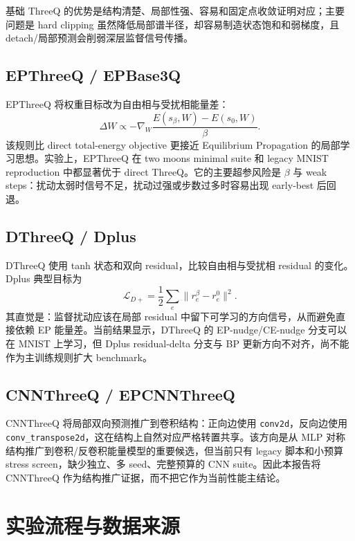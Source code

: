\documentclass[UTF8,zihao=-4]{ctexart}
\begin{document}
        基础 ThreeQ 的优势是结构清楚、局部性强、容易和固定点收敛证明对应；主要问题是 hard clipping 虽然降低局部谱半径，却容易制造状态饱和和弱梯度，且 detach/局部预测会削弱深层监督信号传播。

        \subsection{EPThreeQ / EPBase3Q}

        EPThreeQ 将权重目标改为自由相与受扰相能量差：
        \begin{equation}
        \Delta W \propto -\nabla_W\frac{E(s_\beta,W)-E(s_0,W)}{\beta}.
        \end{equation}
        该规则比 direct total-energy objective 更接近 Equilibrium Propagation 的局部学习思想。实验上，EPThreeQ 在 two moons minimal suite 和 legacy MNIST reproduction 中都显著优于 direct ThreeQ。它的主要超参风险是 $\beta$ 与 weak steps：扰动太弱时信号不足，扰动过强或步数过多时容易出现 early-best 后回退。

        \subsection{DThreeQ / Dplus}

        DThreeQ 使用 tanh 状态和双向 residual，比较自由相与受扰相 residual 的变化。Dplus 典型目标为
        \begin{equation}
        \mathcal{L}_{D+}=\frac{1}{2}\sum_e\|r_e^\beta-r_e^0\|^2.
        \end{equation}
        其直觉是：监督扰动应该在局部 residual 中留下可学习的方向信号，从而避免直接依赖 EP 能量差。当前结果显示，DThreeQ 的 EP-nudge/CE-nudge 分支可以在 MNIST 上学习，但 Dplus residual-delta 分支与 BP 更新方向不对齐，尚不能作为主训练规则扩大 benchmark。

        \subsection{CNNThreeQ / EPCNNThreeQ}

        CNNThreeQ 将局部双向预测推广到卷积结构：正向边使用 \texttt{conv2d}，反向边使用 \texttt{conv\_transpose2d}，这在结构上自然对应严格转置共享。该方向是从 MLP 对称结构推广到卷积/反卷积能量模型的重要候选，但当前只有 legacy 脚本和小预算 stress screen，缺少独立、多 seed、完整预算的 CNN suite。因此本报告将 CNNThreeQ 作为结构推广证据，而不把它作为当前性能主结论。

        \section{实验流程与数据来源}
\end{document}
